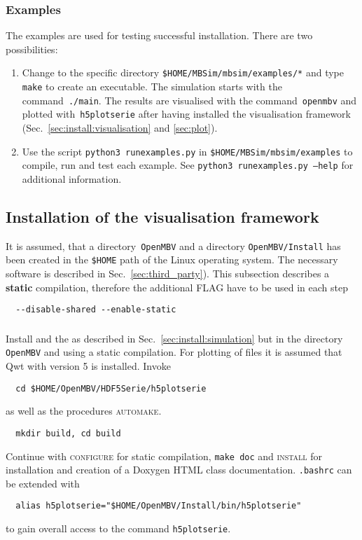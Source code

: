 \subsubsection{Examples}
The examples are used for testing successful installation. There are two possibilities:
\begin{enumerate}
\item Change to the specific directory \texttt{\$HOME/MBSim/mbsim/examples/*} and type \texttt{make} to create an executable. The simulation starts with the command~\texttt{./main}. The results are visualised with the command~\texttt{openmbv} and plotted with~\texttt{h5plotserie} after having installed the visualisation framework (Sec.~\ref{sec:install:visualisation} and \ref{sec:plot}).
\item Use the script \texttt{python3 runexamples.py} in \texttt{\$HOME/MBSim/mbsim/examples} to compile, run and test each example. See \texttt{python3 runexamples.py --help} for additional information.
\end{enumerate}
%
\subsection{Installation of the visualisation framework\label{sec:install:visualisation}}
It is assumed, that a directory~\texttt{OpenMBV} and a directory \texttt{OpenMBV/Install} has been created in the \texttt{\$HOME} path of the Linux operating system. The necessary software is described in Sec.~\ref{sec:third_party}). This subsection describes a \textbf{static} compilation, therefore the additional FLAG have to be used in each step
\begin{verbatim}
  --disable-shared --enable-static
\end{verbatim}

\subsubsection{\HDF}
Install \HDF{} and the \HDFSerie{} as described in Sec.~\ref{sec:install:simulation} but in the directory \texttt{OpenMBV} and using a static compilation. For plotting of \HDF{} files it is assumed that Qwt with version 5 is installed. Invoke 
\begin{verbatim}
  cd $HOME/OpenMBV/HDF5Serie/h5plotserie
\end{verbatim}
as well as the procedures \textsc{automake}.
\begin{verbatim}
  mkdir build, cd build
\end{verbatim}
Continue with \textsc{configure} for static compilation, \texttt{make doc} and \textsc{install} for installation and creation of a Doxygen HTML class documentation. \texttt{.bashrc} can be extended with
\begin{verbatim}
  alias h5plotserie="$HOME/OpenMBV/Install/bin/h5plotserie"
\end{verbatim}
to gain overall access to the command \texttt{h5plotserie}.


